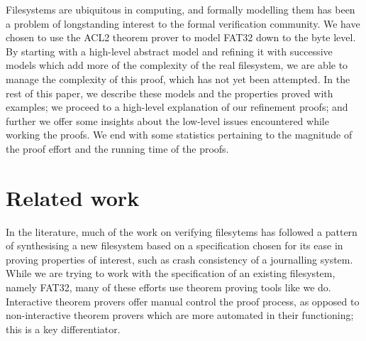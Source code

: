 \documentclass[runningheads,a4paper]{llncs}
\begin{document}
Filesystems are ubiquitous in computing, and formally modelling them
has been a problem of longstanding interest to the formal verification
community. We have chosen to use the ACL2 theorem prover
to model FAT32 down to the byte level. By starting with a high-level
abstract model and refining \cite{abadi1991existence} it with
successive models which add more of the complexity of the real
filesystem, we are able to manage the complexity of this proof, which
has not yet been attempted. In the rest of this paper, we describe these
models and the properties proved with examples; we proceed to a
high-level explanation of our refinement proofs; and further we offer
some insights about the low-level issues encountered while working the
proofs. We end with some statistics pertaining to the magnitude of the
proof effort and the running time of the proofs.

\section{Related work}

In the literature, much of the work on verifying filesytems has
followed a pattern of synthesising a new filesystem based on a
specification chosen for its ease in proving properties of interest,
such as crash consistency of a journalling system. While we are trying
to work with the specification of an existing filesystem, namely
FAT32, many of these efforts use theorem proving tools like we
do. Interactive theorem provers offer manual control the proof
process, as opposed to non-interactive theorem provers which are more
automated in their functioning; this is a key differentiator.
\end{document}
